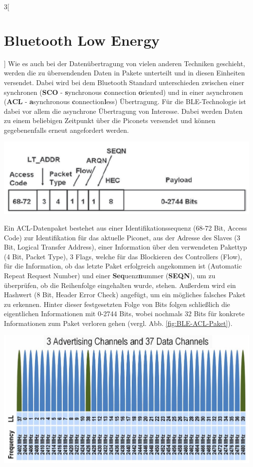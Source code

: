 \begin{multicols}{3}[\section{Bluetooth Low Energy}]
Wie es auch bei der Datenübertragung von vielen anderen Techniken geschieht, werden die zu übersendenden Daten in Pakete unterteilt und in diesen Einheiten versendet. Dabei wird bei dem Bluetooth Standard unterschieden zwischen einer synchronen (\textbf{SCO} - \textbf{s}ynchronous \textbf{c}onnection \textbf{o}riented) und in einer asynchronen (\textbf{ACL} - \textbf{a}synchronous \textbf{c}onnection\textbf{l}ess) Übertragung. Für die BLE-Technologie ist dabei vor allem die asynchrone Übertragung von Interesse. Dabei werden Daten zu einem beliebigen Zeitpunkt über die Piconets versendet und können gegebenenfalls erneut angefordert werden.
\begin{Figure}
\includegraphics[width=\linewidth]{Kapitel/BLE/Grafiken/paket.png}
\label{fig:BLE-ACL-Paket}
\end{Figure}
Ein ACL-Datenpaket bestehet aus einer Identifikationssequenz (68-72 Bit, Access Code) zur Identifikation für das aktuelle Piconet, aus der Adresse des Slaves (3 Bit, Logical Transfer Address), einer Information über den verwendeten Pakettyp (4 Bit, Packet Type), 3 Flags, welche für das Blockieren des Controllers (Flow), für die Information, ob das letzte Paket erfolgreich angekommen ist (Automatic Repeat Request Number) und einer \textbf{Seq}uenz\textbf{n}ummer (\textbf{SEQN}), um zu überprüfen, ob die Reihenfolge eingehalten wurde, stehen. Außerdem wird ein Hashwert (8 Bit, Header Error Check) angefügt, um ein mögliches falsches Paket zu erkennen. Hinter dieser festgesetzten Folge von Bits folgen schließlich die eigentlichen Informationen mit  0-2744 Bits, wobei nochmals 32 Bits für konkrete Informationen zum Paket verloren gehen (vergl. Abb. \ref{fig:BLE-ACL-Paket}).
\begin{Figure}
\includegraphics[width=\linewidth]{Kapitel/BLE/Grafiken/BLE_DC.jpg}

\end{Figure}
\end{multicols}
